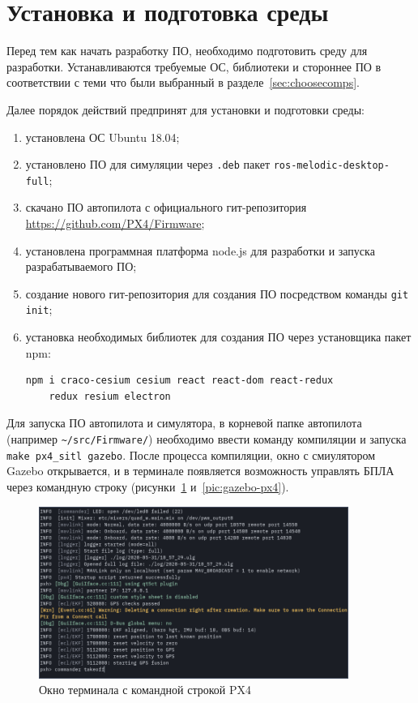 \documentclass[specification,annotation]{itmo-student-thesis}
\begin{document}
\section{Установка и подготовка среды}\label{sec:devenviron}

Перед тем как начать разработку ПО, необходимо подготовить среду для разработки.
Устанавливаются требуемые ОС, библиотеки и стороннее ПО в соответствии с теми
что были выбранный в разделе~\ref{sec:choosecomps}.

Далее порядок действий предпринят для установки и подготовки среды:

\begin{enumerate}
  \item установлена ОС Ubuntu 18.04;
  \item установлено ПО для симуляции через \verb|.deb| пакет
    \verb|ros-melodic-desktop-full|;
  \item скачано ПО автопилота с официального гит-репозитория
    \url{https://github.com/PX4/Firmware};
  \item установлена программная платформа node.js для разработки и запуска
    разрабатываемого ПО;
  \item создание нового гит-репозитория для создания ПО посредством команды
    \verb|git init|;
  \item установка необходимых библиотек для создания ПО через установщика пакет
    npm: \begin{verbatim}npm i craco-cesium cesium react react-dom react-redux
    redux resium electron\end{verbatim}
\end{enumerate}

Для запуска ПО автопилота и симулятора, в корневой папке автопилота (например
\verb|~/src/Firmware/|) необходимо ввести команду компиляции и запуска
\verb|make px4_sitl gazebo|. После процесса компиляции, окно с смиулятором
Gazebo открывается, и в терминале появляется возможность управлять БПЛА через
командную строку (рисунки~\ref{pic:px4-cli} и~\ref{pic:gazebo-px4}).

\begin{figure}[H]
  \caption{Окно терминала с командной строкой PX4}\label{pic:px4-cli}
  \centering
  \includegraphics[width=0.9\textwidth]{px4-cli}
\end{figure}
\end{document}

